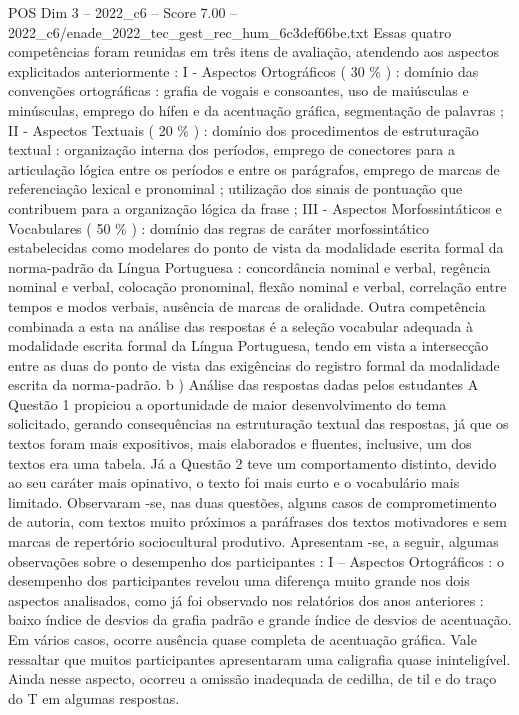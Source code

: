 \begin{textsample}{POS Dim 3 – 2022\_c6 – Score 7.00 – 2022\_c6/enade\_2022\_tec\_gest\_rec\_hum\_6c3def66be.txt}
Essas quatro competências foram reunidas em três itens de avaliação, atendendo aos aspectos explicitados anteriormente : I - Aspectos Ortográficos ( 30 \% ) : domínio das convenções ortográficas : grafia de vogais e consoantes, uso de maiúsculas e minúsculas, emprego do hífen e da acentuação gráfica, segmentação de palavras ; II - Aspectos Textuais ( 20 \% ) : domínio dos procedimentos de estruturação textual : organização interna dos períodos, emprego de conectores para a articulação lógica entre os períodos e entre os parágrafos, emprego de marcas de referenciação lexical e pronominal ; utilização dos sinais de pontuação que contribuem para a organização lógica da frase ; III - Aspectos Morfossintáticos e Vocabulares ( 50 \% ) : domínio das regras de caráter morfossintático estabelecidas como modelares do ponto de vista da modalidade escrita formal da norma-padrão da Língua Portuguesa : concordância nominal e verbal, regência nominal e verbal, colocação pronominal, flexão nominal e verbal, correlação entre tempos e modos verbais, ausência de marcas de oralidade.
Outra competência combinada a esta na análise das respostas é a seleção vocabular adequada à modalidade escrita formal da Língua Portuguesa, tendo em vista a intersecção entre as duas do ponto de vista das exigências do registro formal da modalidade escrita da norma-padrão. b ) Análise das respostas dadas pelos estudantes A Questão 1 propiciou a oportunidade de maior desenvolvimento do tema solicitado, gerando consequências na estruturação textual das respostas, já que os textos foram mais expositivos, mais elaborados e fluentes, inclusive, um dos textos era uma tabela.
Já a Questão 2 teve um comportamento distinto, devido ao seu caráter mais opinativo, o texto foi mais curto e o vocabulário mais limitado.
Observaram -se, nas duas questões, alguns casos de comprometimento de autoria, com textos muito próximos a paráfrases dos textos motivadores e sem marcas de repertório sociocultural produtivo.
Apresentam -se, a seguir, algumas observações sobre o desempenho dos participantes : I – Aspectos Ortográficos : o desempenho dos participantes revelou uma diferença muito grande nos dois aspectos analisados, como já foi observado nos relatórios dos anos anteriores : baixo índice de desvios da grafia padrão e grande índice de desvios de acentuação.
Em vários casos, ocorre ausência quase completa de acentuação gráfica.
Vale ressaltar que muitos participantes apresentaram uma caligrafia quase ininteligível.
Ainda nesse aspecto, ocorreu a omissão inadequada de cedilha, de til e do traço do T em algumas respostas.

\end{textsample}
